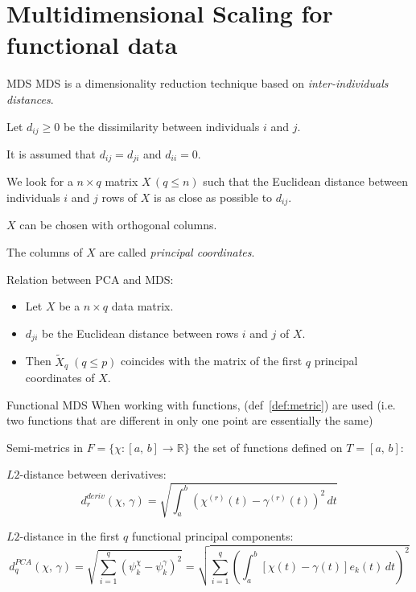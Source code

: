 %
\section{Multidimensional Scaling for functional data}%

\begin{recap}{MDS}{}
MDS is a dimensionality reduction technique based on \emph{inter-individuals distances}.

Let $d_{ij} \geq 0$ be the dissimilarity between individuals $i$ and $j$.

It is assumed that $d_{ij} = d_{ji}$ and $d_{ii} = 0$.

We look for a $n \times q$ matrix $X\, (q \leq n)$ such that
the Euclidean distance between individuals $i$ and $j$ rows of $X$ is
as close as possible to $d_{ij}$.

$X$ can be chosen with orthogonal columns.

The columns of $X$ are called \emph{principal coordinates}.

\tcbline
Relation between PCA and MDS:
\begin{itemize}
    \item Let $X$ be a $n \times q$ data matrix.
    \item $d_{ji}$ be the Euclidean distance between rows $i$ and $j$ of $X$.
    \item Then $\tilde X_q\;(q \leq p)$ coincides with the matrix of the first
        $q$ principal coordinates of $X$.
\end{itemize}
\end{recap}

\begin{definition}{Functional MDS}{}
    When working with functions,  (def~\ref{def:metric}) are used (i.e. two
    functions that are different in only one point are essentially the same)
\end{definition}

\begin{example}{Semi-metrics in $F = \{\chi : [a,\,b] \to \mathds R\}$}{}
    the set of functions defined on $T = [a,\,b]$:

    $L2$-distance between derivatives:
    \begin{equation*}
        d_r^{deriv}(\chi,\,\gamma) = \sqrt{
            \int_a^b \left(
                \chi^{(r)}(t) - \gamma^{(r)}(t)
            \right)^2 \,dt
        }
    \end{equation*}

    $L2$-distance in the first $q$ functional principal components:
    \begin{equation*}
        d_q^{PCA}(\chi,\,\gamma) = \sqrt{
            \sum_{i=1}^q \left(
                \psi_k^\chi - \psi_k^\gamma
            \right)^2
        } = \sqrt{
            \sum_{i=1}^q \left(
                \int_a^b \left[
                    \chi(t) - \gamma(t)
                \right] e_k(t) \,dt
            \right)^2
        }
    \end{equation*}
\end{example}


